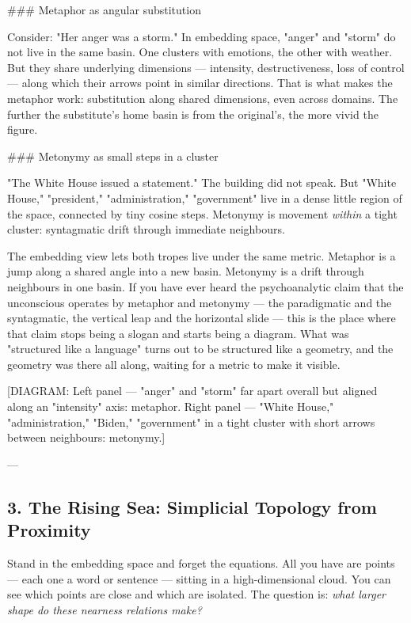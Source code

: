 \documentclass[12pt,a4paper]{article}
\begin{document}
\#\#\# Metaphor as angular substitution

Consider: "Her anger was a storm." In embedding space, "anger" and "storm" do not live in the same basin. One clusters with emotions, the other with weather. But they share underlying dimensions --- intensity, destructiveness, loss of control --- along which their arrows point in similar directions. That is what makes the metaphor work: substitution along shared dimensions, even across domains. The further the substitute's home basin is from the original's, the more vivid the figure.

\#\#\# Metonymy as small steps in a cluster

"The White House issued a statement." The building did not speak. But "White House," "president," "administration," "government" live in a dense little region of the space, connected by tiny cosine steps. Metonymy is movement \textit{within} a tight cluster: syntagmatic drift through immediate neighbours.

The embedding view lets both tropes live under the same metric. Metaphor is a jump along a shared angle into a new basin. Metonymy is a drift through neighbours in one basin. If you have ever heard the psychoanalytic claim that the unconscious operates by metaphor and metonymy --- the paradigmatic and the syntagmatic, the vertical leap and the horizontal slide --- this is the place where that claim stops being a slogan and starts being a diagram. What was "structured like a language" turns out to be structured like a geometry, and the geometry was there all along, waiting for a metric to make it visible.

[DIAGRAM: Left panel --- "anger" and "storm" far apart overall but aligned along an "intensity" axis: metaphor. Right panel --- "White House," "administration," "Biden," "government" in a tight cluster with short arrows between neighbours: metonymy.]

---

\subsection{3. The Rising Sea: Simplicial Topology from Proximity}

Stand in the embedding space and forget the equations. All you have are points --- each one a word or sentence --- sitting in a high-dimensional cloud. You can see which points are close and which are isolated. The question is: \textit{what larger shape do these nearness relations make?}
\end{document}
